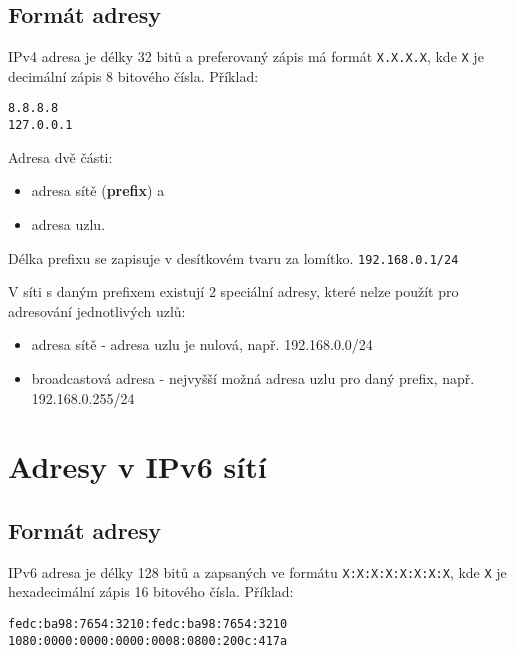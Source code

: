 \subsection{Formát adresy}
IPv4 adresa je délky 32 bitů a preferovaný zápis má formát {\tt X.X.X.X}, kde
{\tt X} je decimální zápis 8 bitového čísla. Příklad:\\
\begin{verbatim}
8.8.8.8
127.0.0.1
\end{verbatim}

Adresa dvě části:
\begin{itemize}
    \item adresa sítě ({\bf prefix}) a
    \item adresa uzlu.
\end{itemize}
Délka prefixu se zapisuje v desítkovém tvaru za lomítko. {\tt 192.168.0.1/24}

V síti s daným prefixem existují 2 speciální adresy, které nelze použít pro
adresování jednotlivých uzlů:
\begin{itemize}
    \item adresa sítě - adresa uzlu je nulová, např. 192.168.0.0/24
    \item broadcastová adresa - nejvyšší možná adresa uzlu pro daný prefix,
        např. 192.168.0.255/24
\end{itemize}

\section{Adresy v IPv6 sítí}\label{ipv6-teorie}

\subsection{Formát adresy}
IPv6 adresa je délky 128 bitů a zapsaných ve formátu {\tt X:X:X:X:X:X:X:X}, kde
{\tt X} je hexadecimální zápis 16 bitového čísla.
Příklad:\\
\begin{verbatim}
fedc:ba98:7654:3210:fedc:ba98:7654:3210
1080:0000:0000:0000:0008:0800:200c:417a
\end{verbatim}

